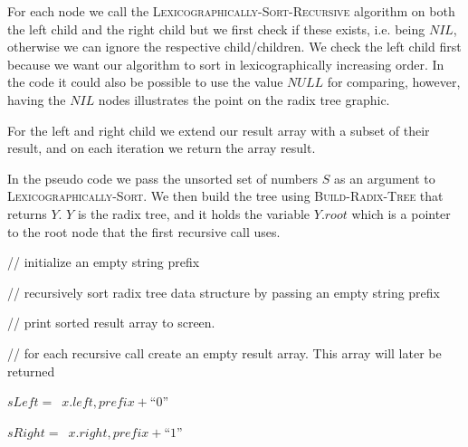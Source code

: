 \documentclass{article}
\newcommand{\method}[1]{\textsc{#1}}
\begin{document}
For each node we call the \method{Lexicographically-Sort-Recursive} algorithm on both the left child and the right child but we first check if these exists, i.e. being $NIL$, otherwise we can ignore the respective child/children. We check the left child first because we want our algorithm to sort in lexicographically increasing order. In the code it could also be possible to use the value $NULL$ for comparing, however, having the $NIL$ nodes illustrates the point on the radix tree graphic.

For the left and right child we extend our result array with a subset of their result, and on each iteration we return the array result.

In the pseudo code we pass the unsorted set of numbers $S$ as an argument to \method{Lexicographically-Sort}. We then build the tree using \method{Build-Radix-Tree} that returns $Y$. $Y$ is the radix tree, and it holds the variable $Y.root$ which is a pointer to the root node that the first recursive call uses.


\begin{center}
	\begin{minipage}{12cm}
		\begin{algorithmic}
			// initialize an empty string prefix

			// recursively sort radix tree data structure by passing an empty string prefix

			// print sorted result array to screen.

			\vspace{5mm}

			\EndProcedure{}

			 // for each recursive call create an empty result array. This array will later be returned

			\EndIf{}

			\vspace{3mm}
			\State \mbox{$sLeft =$
				{$x.left, prefix + \text{``0''}$}}
			\EndIf{}
			\vspace{3mm}

			\State \mbox{$sRight =$
				{$x.right, prefix + \text{``1''}$}}
			\EndIf{}

			\vspace{3mm}


			\EndProcedure
		\end{algorithmic}
	\end{minipage}
\end{center}
\end{document}
